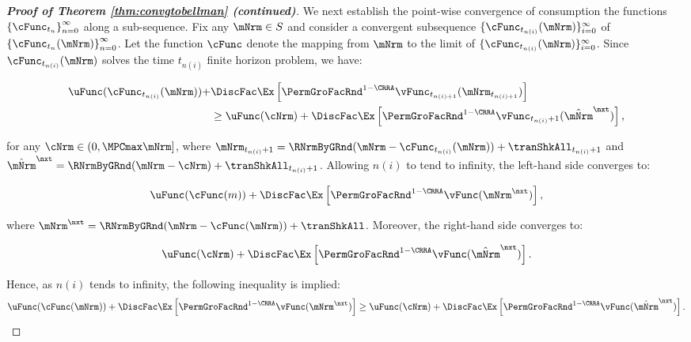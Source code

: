 \documentclass[\econtexRoot/BufferStockTheory]{subfiles}
\begin{document}
\begin{proof}[\textbf{Proof of Theorem \ref{thm:convgtobellman} (continued)}]
%
We next establish the point-wise convergence of consumption the functions $\left\{ \cFunc_{t_{n}}\right\}_{n=0}^{\infty}$ along a sub-sequence. Fix any $\mNrm\in S$ and consider a convergent subsequence $\{\cFunc_{t_{n(i)}}(\mNrm)\}_{i=0}^{\infty}$ of $\left\{ \cFunc_{t_{n}}(\mNrm) \right\}_{n=0}^{\infty}$. Let the function $\cFunc$ denote the mapping from $\mNrm$ to the limit of $\{\cFunc_{t_{n(i)}}(\mNrm)\}_{i=0}^{\infty}$. Since $\cFunc_{t_{n(i)}}(\mNrm)$ solves the time $t_{n(i)}$ finite horizon problem, we have:

\begin{samepage}
\begin{equation}
\begin{split}
\uFunc(\cFunc_{t_{n(i)}}(\mNrm)) + & \DiscFac \Ex \left[ {\PermGroFacRnd}^{1 - \CRRA} \vFunc_{t_{n(i)+1}}(\mNrm_{t_{n(i)+1}}) \right] \\ 
& \geq \uFunc(\cNrm) + \DiscFac \Ex \left[ {\PermGroFacRnd}^{1 - \CRRA} \vFunc_{t_{n(i)}+1}(\hat{\mNrm}^{\nxt}) \right], 
\end{split}
\end{equation}
\end{samepage}
for any $\cNrm \in (0, \MPCmax \mNrm]$, where $\mNrm_{t_{n(i)}+1} = \RNrmByGRnd(\mNrm - \cFunc_{t_{n(i)}}(\mNrm)) + \tranShkAll_{t_{n(i)}+1}$ and $\hat{\mNrm}^{\nxt} = \RNrmByGRnd(\mNrm - \cNrm) + \tranShkAll_{t_{n(i)}+1}$.
%
Allowing $n(i)$ to tend to infinity, the left-hand side converges to:
 
\begin{equation}
\uFunc(\cFunc(m)) + \DiscFac \Ex \left[ {\PermGroFacRnd}^{1 - \CRRA} \vFunc(\mNrm^{\nxt}) \right],
\end{equation}

where $\mNrm^{\nxt} = \RNrmByGRnd(\mNrm - \cFunc(\mNrm)) + \tranShkAll$.
Moreover, the right-hand side converges to:

\begin{equation}
\uFunc(\cNrm) + \DiscFac \Ex \left[ {\PermGroFacRnd}^{1 - \CRRA} \vFunc(\hat{\mNrm}^{\nxt}) \right].
\end{equation}

Hence, as $n(i)$ tends to infinity, the following inequality is implied:
\begin{equation}
\uFunc(\cFunc(\mNrm)) + \DiscFac \Ex \left[ {\PermGroFacRnd}^{1 - \CRRA} \vFunc(\mNrm^{\nxt}) \right] \geq \uFunc(\cNrm) + \DiscFac \Ex \left[ {\PermGroFacRnd}^{1 - \CRRA} \vFunc(\hat{\mNrm}^{\nxt}) \right].
\end{equation}


\end{proof}
\end{document}
